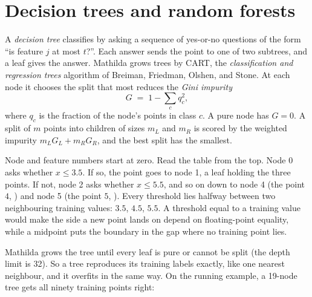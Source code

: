 \section{Decision trees and random forests}
\label{sec:ml-trees}

A \emph{decision tree} classifies by asking a sequence of
yes-or-no questions of the form ``is feature \(j\) at most \(t\)?''. Each answer
sends the point to one of two subtrees, and a leaf gives the answer. Mathilda grows
trees by CART, the \emph{classification and regression trees} algorithm of
Breiman, Friedman, Olshen, and Stone. At each node it chooses the split that most
reduces the \emph{Gini impurity}
\[
  G \;=\; 1 - \sum_{c} q_c^2 ,
\]
where \(q_c\) is the fraction of the node's points in class \(c\). A pure node has
\(G = 0\). A split of \(m\) points into children of sizes \(m_L\) and \(m_R\) is
scored by the weighted impurity \(m_L G_L + m_R G_R\), and the best split has the
smallest.

\begin{codepairs}
\end{codepairs}

Node and feature numbers start at zero. Read the table from the top. Node 0 asks
whether \(x \le 3.5\). If so, the point goes to node 1, a leaf holding the three
 points. If not, node 2 asks whether \(x \le 5.5\), and so on down to
node 4 (the point \(4\), ) and node 5 (the point \(5\),
). Every threshold lies halfway between two neighbouring training
values: \(3.5\), \(4.5\), \(5.5\). A threshold equal to a training value would
make the side a new point lands on depend on floating-point equality, while a
midpoint puts the boundary in the gap where no training point lies.

Mathilda grows the tree until every leaf is pure or cannot be split (the depth
limit is 32). So a tree reproduces its training labels exactly, like one nearest
neighbour, and it overfits in the same way. On the running example, a 19-node
tree gets all ninety training points right:

